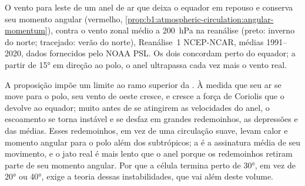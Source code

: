 \begin{omfigure}

{\small O vento para leste de um anel de ar que deixa o equador em repouso e conserva seu momento
angular (vermelho, \cref{prop:b1:atmospheric-circulation:angular-momentum}), contra o vento zonal médio
a \qty{200}{hPa} na reanálise (preto: inverno do norte; tracejado: verão do norte), Reanálise~1
NCEP-NCAR, médias 1991--2020, dados fornecidos pelo NOAA PSL. Os dois concordam perto do equador; a
partir de \ang{15} em direção ao polo, o anel ultrapassa cada vez mais o vento real.}
\label{fig:b1:atmospheric-circulation:angular-momentum}
\end{omfigure}

A proposição impõe um limite ao ramo superior da . À medida que seu ar se move para o
polo, seu vento de oeste cresce, e cresce a força de Coriolis que o devolve ao equador; muito antes de
se atingirem as velocidades do anel, o escoamento se torna instável e se desfaz em grandes redemoinhos,
as depressões e  das  médias. Esses redemoinhos, em vez de uma circulação suave,
levam calor e momento angular para o polo além dos subtrópicos; a  é a assinatura média
de seu movimento, e o jato real é mais lento que o anel porque os redemoinhos retiram parte de seu
momento angular. Por que a célula termina perto de \ang{30}, em vez de \ang{20} ou \ang{40}, exige a
teoria dessas instabilidades, que vai além deste volume.

